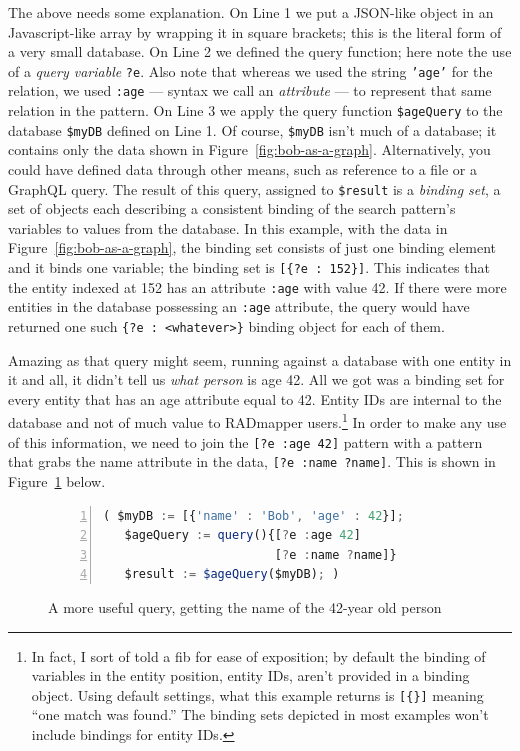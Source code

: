 \documentclass[9pt,letterpaper]{article}
\newcommand{\stt}[1]{\texttt{#1}} %
\begin{document}
The above needs some explanation.
On Line 1 we put a JSON-like object in an Javascript-like array by wrapping it in square brackets; this is the literal form of a very small database.
On Line 2 we defined the query function; here note the use of a \textit{query variable} \stt{?e}.
Also note that whereas we used the string \stt{'age'} for the relation, we used \stt{:age} --- syntax we call an \textit{attribute} --- to represent that same relation in the pattern.
On Line 3 we apply the query function \stt{\$ageQuery} to the database \stt{\$myDB} defined on Line 1.
Of course, \stt{\$myDB} isn't much of a database; it contains only the data shown in Figure~\ref{fig:bob-as-a-graph}.
Alternatively, you could have defined data through other means, such as reference to a file or a GraphQL query.
The result of this query, assigned to \stt{\$result} is a \textit{binding set}, a set of objects each describing a consistent binding of the search pattern's variables to values from the database.
In this example, with the data in Figure~\ref{fig:bob-as-a-graph}, the binding set consists of just one binding element and it binds one variable; the binding set is \stt{[\{?e : 152\}]}.
This indicates that the entity indexed at 152 has an attribute \stt{:age} with value 42.
If there were more entities in the database possessing an \stt{:age} attribute, the query would have returned one such \stt{\{?e : <whatever>\}}
binding object for each of them.

Amazing as that query might seem, running against a database with one entity in it and all, it didn't tell us \textit{what person} is age 42.
All we got was a binding set for every entity that has an age attribute equal to 42.
Entity IDs are internal to the database and not of much value to RADmapper users.\footnote{In fact, I sort of told a fib for ease of exposition; by default the binding of variables in the entity position, entity IDs, aren't provided in a binding object.
  Using default settings, what this example returns is \stt{[\{\}]} meaning ``one match was found.''
The binding sets depicted in most examples won't include bindings for entity IDs.}
In order to make any use of this information, we need to join the \stt{[?e :age 42]} pattern with a pattern that grabs the name attribute in the data, \stt{[?e :name ?name]}.
This is shown in Figure~\ref{code:bob-age-more} below.

\begin{figure}[H]
    \caption{A more useful query, getting the name of the 42-year old person}
    \label{code:bob-age-more}
\begin{lstlisting}[language=JavaScript,numberstyle=\scriptsize,basicstyle=\ttfamily\scriptsize,numbers=left,stepnumber=1,breaklines=true]
 ( $myDB := [{'name' : 'Bob', 'age' : 42}];
   $ageQuery := query(){[?e :age 42]
                        [?e :name ?name]}
   $result := $ageQuery($myDB); )
\end{lstlisting}
\end{figure} \vspace{-2em}
\end{document}
